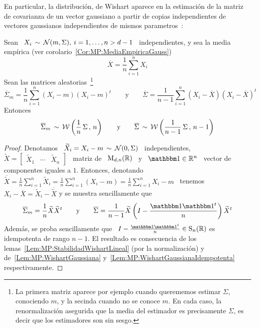 %
En particular,  la distribuci\'on, de Wishart  aparece en la  estimaci\'on de la
matriz de covarianza de un vector  gaussiano a partir de copias independientes de
vectores gaussianos independientes de mismos parametros~\cite{KotNad04, BilBre99,
  And03, Seb04, GupNag99}:
%
\begin{corolario}\label{Cor:MP:WishartEstimacion}
  Sean  \  $X_i \,  \sim  \,  \mathcal{N}(m,\Sigma), \:  i  =  1, \ldots  ,  n  > d-1$  \
  independientes,      y       sea      la      media       emp\'irica      (ver
  corolario~\ref{Cor:MP:MediaEmpiricaGauss})
  \[
  \overline{X} = \frac{1}{n} \sum_{i=1}^n X_i
  \]
  Sean las  matrices aleatorias~\footnote{La primera matriz  aparece por ejemplo
    cuando querememos estimar  $\Sigma$, conociendo $m$, y la  secinda cuando no
    se conoce $m$. En cada caso, la renormalizaci\'on asegurida que la media del
    estimador es  precisamente $\Sigma$,  es decir que  los estimadores  son sin
    sesgo.}
  \[
  \overline{\Sigma}_m =  \frac{1}{n} \sum_{i=1}^n (X_i  - m) (X_i -  m)^t \qquad
  \mbox{y} \qquad  \overline{\Sigma} =  \frac{1}{n-1} \sum_{i=1}^n \left(  X_i -
    \overline{X} \right) \left( X_i - \overline{X} \right)^t
  \]
  Entonces
  \[
  \overline{\Sigma}_m  \, \sim  \,  \mathcal{W}\left( \frac{1}{n}  \,  \Sigma \,  , \,  n
  \right)  \qquad   \mbox{y}  \qquad  \overline{\Sigma}  \,   \sim  \,  \mathcal{W}\left(
    \frac{1}{n-1} \, \Sigma \, , \, n-1 \right)
  \]
\end{corolario}
%
\begin{proof}
  Denotamos  \  $\widetilde{X}_i   =  X_i  -  m  \,   \sim  \,  \mathcal{N}(0,\Sigma)$  \
  independientes, \ $\widetilde{X} =  \begin{bmatrix} \widetilde{X}_1 & \cdots &
    \widetilde{X}_n \end{bmatrix}$  \ matriz de  \ $\mathrm{M}_{d,n}(\mathbb{R})$ \ y  \ $\un
  \in  \Rset^n$ \  vector de  componentes  iguales a  $1$.  Entonces,  denotando
  $\overline{\widetilde{X}}   =  \frac{1}{n}   \sum_{i=1}^n   \widetilde{X}_i  =
  \frac{1}{n}  \sum_{i=1}^n (X_i  - m)  = \frac{1}{n}  \sum_{i=1}^n X_i  -  m$ \
  tenemos \ $X_i -  \overline{X} = \widetilde{X}_i - \overline{\widetilde{X}}$ y
  se muestra sencillamente que
  \[
  \overline{\Sigma}_m   =  \frac{1}{n}   \widetilde{X}   \widetilde{X}^t  \qquad
  \mbox{y}  \qquad \overline{\Sigma}  = \frac{1}{n-1}  \widetilde{X} \left(  I -
    \frac{\un \un^t}{n} \right) \widetilde{X}^t
  \]
  Adem\'as,  se  proba  sencillamente  que   \  $I  -  \frac{\un  \un^t}{n}  \in
  \Sim_n(\Rset)$ es idempotenta de rango $n-1$. El resultado es consecuencia de los
  lemas~\ref{Lem:MP:StabilidadWishartLineal}   (por    la   normalizaci\'on)   y
  de~\ref{Lem:MP:WishartGaussiana}       y~\ref{Lem:MP:WishartGaussianaIdempotenta}
  respectivamente.
\end{proof}

